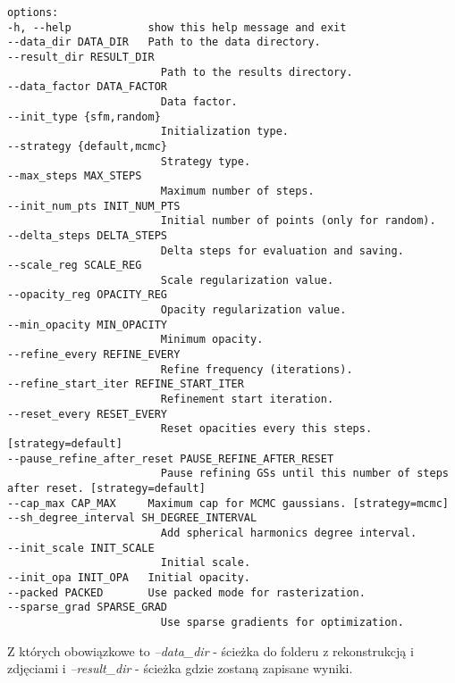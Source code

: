 \lstset{style=basicstyle}
\begin{lstlisting}[language=SHELXL] 
options:
-h, --help            show this help message and exit
--data_dir DATA_DIR   Path to the data directory.
--result_dir RESULT_DIR
                        Path to the results directory.
--data_factor DATA_FACTOR
                        Data factor.
--init_type {sfm,random}
                        Initialization type.
--strategy {default,mcmc}
                        Strategy type.
--max_steps MAX_STEPS
                        Maximum number of steps.
--init_num_pts INIT_NUM_PTS
                        Initial number of points (only for random).
--delta_steps DELTA_STEPS
                        Delta steps for evaluation and saving.
--scale_reg SCALE_REG
                        Scale regularization value.
--opacity_reg OPACITY_REG
                        Opacity regularization value.
--min_opacity MIN_OPACITY
                        Minimum opacity.
--refine_every REFINE_EVERY
                        Refine frequency (iterations).
--refine_start_iter REFINE_START_ITER
                        Refinement start iteration.
--reset_every RESET_EVERY
                        Reset opacities every this steps. [strategy=default]
--pause_refine_after_reset PAUSE_REFINE_AFTER_RESET
                        Pause refining GSs until this number of steps after reset. [strategy=default]
--cap_max CAP_MAX     Maximum cap for MCMC gaussians. [strategy=mcmc]
--sh_degree_interval SH_DEGREE_INTERVAL
                        Add spherical harmonics degree interval.
--init_scale INIT_SCALE
                        Initial scale.
--init_opa INIT_OPA   Initial opacity.
--packed PACKED       Use packed mode for rasterization.
--sparse_grad SPARSE_GRAD
                        Use sparse gradients for optimization.

\end{lstlisting}

\lstset{style=pythonstyle}

Z których obowiązkowe to \textit{--data\_dir} - ścieżka do folderu z rekonstrukcją i zdjęciami i \textit{--result\_dir} - ścieżka gdzie zostaną zapisane wyniki. 